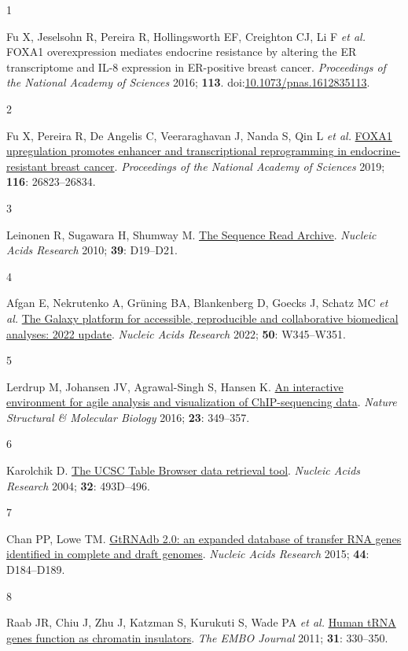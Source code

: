 \documentclass[
  11pt,
]{article}
\newlength{\cslhangindent}
\newlength{\csllabelwidth}
\newlength{\cslentryspacingunit} %
\newenvironment{CSLReferences}[2] %
 {%
  \setlength{\parindent}{0pt}
  \ifodd #1
  \let\oldpar\par
  \def\par{\hangindent=\cslhangindent\oldpar}
  \fi
  \setlength{\parskip}{#2\cslentryspacingunit}
 }%
 {}
\newcommand{\CSLLeftMargin}[1]{\parbox[t]{\csllabelwidth}{#1}}
\newcommand{\CSLRightInline}[1]{\parbox[t]{\linewidth - \csllabelwidth}{#1}\break}
\begin{document}
\hypertarget{refs}{}
\begin{CSLReferences}{0}{0}
\leavevmode{}%
\CSLLeftMargin{1 }%
\CSLRightInline{Fu X, Jeselsohn R, Pereira R, Hollingsworth EF, Creighton CJ, Li F \emph{et al.} FOXA1 overexpression mediates endocrine resistance by altering the ER transcriptome and IL-8 expression in ER-positive breast cancer. \emph{Proceedings of the National Academy of Sciences} 2016; \textbf{113}. doi:\href{https://doi.org/10.1073/pnas.1612835113}{10.1073/pnas.1612835113}.}

\leavevmode{}%
\CSLLeftMargin{2 }%
\CSLRightInline{Fu X, Pereira R, De Angelis C, Veeraraghavan J, Nanda S, Qin L \emph{et al.} \href{https://doi.org/10.1073/pnas.1911584116}{FOXA1 upregulation promotes enhancer and transcriptional reprogramming in endocrine-resistant breast cancer}. \emph{Proceedings of the National Academy of Sciences} 2019; \textbf{116}: 26823--26834.}

\leavevmode{}%
\CSLLeftMargin{3 }%
\CSLRightInline{Leinonen R, Sugawara H, Shumway M. \href{https://doi.org/10.1093/nar/gkq1019}{The Sequence Read Archive}. \emph{Nucleic Acids Research} 2010; \textbf{39}: D19--D21.}

\leavevmode{}%
\CSLLeftMargin{4 }%
\CSLRightInline{Afgan E, Nekrutenko A, Grüning BA, Blankenberg D, Goecks J, Schatz MC \emph{et al.} \href{https://doi.org/10.1093/nar/gkac247}{The Galaxy platform for accessible, reproducible and collaborative biomedical analyses: 2022 update}. \emph{Nucleic Acids Research} 2022; \textbf{50}: W345--W351.}

\leavevmode{}%
\CSLLeftMargin{5 }%
\CSLRightInline{Lerdrup M, Johansen JV, Agrawal-Singh S, Hansen K. \href{https://doi.org/10.1038/nsmb.3180}{An interactive environment for agile analysis and visualization of ChIP-sequencing data}. \emph{Nature Structural \& Molecular Biology} 2016; \textbf{23}: 349--357.}

\leavevmode{}%
\CSLLeftMargin{6 }%
\CSLRightInline{Karolchik D. \href{https://doi.org/10.1093/nar/gkh103}{The UCSC Table Browser data retrieval tool}. \emph{Nucleic Acids Research} 2004; \textbf{32}: 493D--496.}

\leavevmode{}%
\CSLLeftMargin{7 }%
\CSLRightInline{Chan PP, Lowe TM. \href{https://doi.org/10.1093/nar/gkv1309}{GtRNAdb 2.0: an expanded database of transfer RNA genes identified in complete and draft genomes}. \emph{Nucleic Acids Research} 2015; \textbf{44}: D184--D189.}

\leavevmode{}%
\CSLLeftMargin{8 }%
\CSLRightInline{Raab JR, Chiu J, Zhu J, Katzman S, Kurukuti S, Wade PA \emph{et al.} \href{https://doi.org/10.1038/emboj.2011.406}{Human tRNA genes function as chromatin insulators}. \emph{The EMBO Journal} 2011; \textbf{31}: 330--350.}

\end{CSLReferences}
\end{document}
